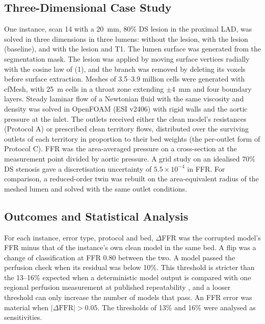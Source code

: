 \subsection{Three-Dimensional Case Study}
One instance, scan 14 with a 20~mm, 80\% DS lesion in the proximal LAD, was solved in three dimensions in three
lumens: without the lesion, with the lesion (baseline), and with the lesion and T1. The lumen surface was generated
from the segmentation mask. The lesion was applied by moving surface vertices radially with the cosine law of
(1), and the branch was removed by deleting its voxels before surface extraction. Meshes of 3.5--3.9 million cells
were generated with cfMesh, with 25~\textmu m cells in a throat zone extending $\pm 4$~mm and four boundary layers. Steady
laminar flow of a Newtonian fluid with the same viscosity and density was solved in OpenFOAM (ESI v2406) with rigid
walls and the aortic pressure at the inlet. The outlets received either the clean model's resistances (Protocol A) or
prescribed clean territory flows, distributed over the surviving outlets of each territory in proportion to their
bed weights (the per-outlet form of Protocol C). FFR was the area-averaged pressure on a cross-section at the measurement point divided by aortic
pressure. A grid study on an idealised 70\% DS stenosis gave a discretisation uncertainty of $5.5\times10^{-4}$ in
FFR. For comparison, a reduced-order twin was rebuilt on the area-equivalent radius of the meshed lumen and solved
with the same outlet conditions.

\subsection{Outcomes and Statistical Analysis}
For each instance, error type, protocol and bed, $\Delta$FFR was the corrupted model's FFR minus that of the
instance's own clean model in the same bed. A flip was a change of classification at FFR 0.80 between the two. A
model passed the perfusion check when its residual was below 10\%. This threshold is stricter than the 13--16\%
expected when a deterministic model output is compared with one regional perfusion measurement at published
repeatability \cite{schindler2023,brown2018}, and a looser threshold can only increase the number of models that
pass. An FFR error was material when $|\Delta\mathrm{FFR}| > 0.05$. The thresholds of 13\% and 16\% were analysed as
sensitivities.

